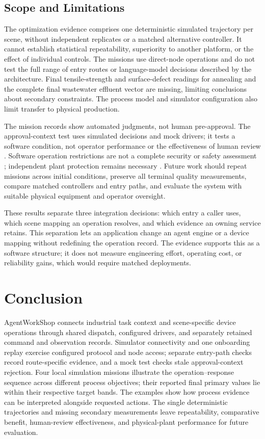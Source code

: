 \subsection{Scope and Limitations}
The optimization evidence comprises one deterministic simulated trajectory per scene,
without independent replicates or a matched alternative controller. It cannot
establish statistical repeatability, superiority to another platform, or the
effect of individual controls. The missions use direct-node operations and
do not test the full range of entry routes or language-model decisions
described by the architecture. Final tensile-strength and surface-defect
readings for annealing and the complete final wastewater effluent vector are
missing, limiting conclusions about secondary constraints. The process model
and simulator configuration also limit transfer to physical production.

The mission records show automated judgments, not human pre-approval. The
approval-context test uses simulated decisions and mock drivers; it tests a
software condition, not operator performance or the effectiveness of human
review \cite{parasuramanmanzey2010complacency,bainbridge1983ironies}.
Software operation restrictions are not a complete security or safety
assessment \cite{greshake2023injection,liu2024pinjection,iec62443-3-3};
independent plant protection remains necessary \cite{iec61511}. Future work
should repeat missions across initial conditions, preserve all terminal
quality measurements, compare matched controllers and entry paths, and
evaluate the system with suitable physical equipment and operator oversight.

These results separate three integration decisions: which entry a caller uses,
which scene mapping an operation resolves, and which evidence an owning service
retains. This separation lets an application change an agent engine or a device
mapping without redefining the operation record. The evidence supports this as
a software structure; it does not measure engineering effort, operating cost,
or reliability gains, which would require matched deployments.

\section{Conclusion}
\label{sec:conclusion}
AgentWorkShop connects industrial task context and scene-specific device
operations through shared dispatch, configured drivers, and separately
retained command and observation records. Simulator connectivity and one
onboarding replay exercise configured protocol and node access; separate
entry-path checks record route-specific evidence, and a mock test checks stale
approval-context rejection. Four local simulation missions
illustrate the operation--response sequence across different process
objectives; their reported final primary values lie within their respective
target bands. The examples show how process evidence can be interpreted alongside requested
actions. The single deterministic trajectories and missing secondary
measurements leave repeatability, comparative benefit, human-review
effectiveness, and physical-plant performance for future evaluation.

